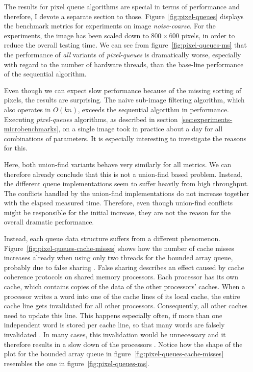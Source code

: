 The results for pixel queue algorithms are special in terms of performance and
therefore, I devote a separate section to those. Figure~\ref{fig:pixel-queues}
displays the benchmark metrics for experiments on image \emph{noise-coarse}. For
the experiments, the image has been scaled down to $800 \times 600$ pixels, in
order to reduce the overall testing time. We can see from
figure~\ref{fig:pixel-queues-ms} that the performance of \emph{all} variants of
\emph{pixel-queues} is dramatically worse, especially with regard to the number
of hardware threads, than the base-line performance of the sequential algorithm.

Even though we can expect slow performance because of the missing sorting of
pixels, the results are surprising. The naive sub-image filtering algorithm,
which also operates in $O(kn)$, exceeds the sequential algorithm in
performance. Executing \emph{pixel-queues} algorithms, as described in
section~\ref{sec:experiments-microbenchmarks}, on a single image took in
practice about a day for all combinations of parameters. It is especially
interesting to investigate the reasons for this.

Here, both union-find variants behave very similarly for all metrics. We can
therefore already conclude that this is not a union-find based problem. Instead,
the different queue implementations seem to suffer heavily from high
throughput. The conflicts handled by the union-find implementations do not
increase together with the elapsed measured time. Therefore, even though
union-find conflicts might be responsible for the initial increase, they are not
the reason for the overall dramatic performance.

Instead, each queue data structure suffers from a different
phenomenon. Figure~\ref{fig:pixel-queues-cache-misses} shows how the number of
cache misses increases already when using only two threads for the bounded array
queue, probably due to false sharing \cite{Bolosky1993False}. False sharing
describes an effect caused by cache coherence protocols on shared memory
processors. Each processor has its own cache, which contains copies of the data
of the other processors' caches. When a processor writes a word into one of the
cache lines of its local cache, the entire cache line gets invalidated for all
other processors. Consequently, all other caches need to update this line. This
happens especially often, if more than one independent word is stored per cache
line, so that many words are falsely invalidated \cite{Bolosky1993False}. In
many cases, this invalidation would be unnecessary and it therefore results in a
slow down of the processors \cite{Bolosky1993False}. Notice how the shape of the
plot for the bounded array queue in figure~\ref{fig:pixel-queues-cache-misses}
resembles the one in figure~\ref{fig:pixel-queues-ms}.

